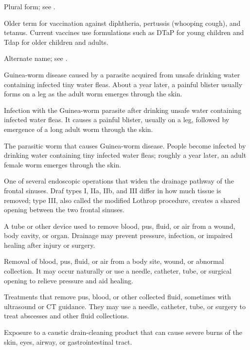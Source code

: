  Plural form; see .

 Older term for vaccination against diphtheria, pertussis (whooping cough), and tetanus. Current vaccines use formulations such as DTaP for young children and Tdap for older children and adults.

 Alternate name; see .

 Guinea-worm disease caused by a parasite acquired from unsafe drinking water containing infected tiny water fleas. About a year later, a painful blister usually forms on a leg as the adult worm emerges through the skin.

 Infection with the Guinea-worm parasite after drinking unsafe water containing infected water fleas. It causes a painful blister, usually on a leg, followed by emergence of a long adult worm through the skin.

 The parasitic worm that causes Guinea-worm disease. People become infected by drinking water containing tiny infected water fleas; roughly a year later, an adult female worm emerges through the skin.

 One of several endoscopic operations that widen the drainage pathway of the frontal sinuses. Draf types I, IIa, IIb, and III differ in how much tissue is removed; type III, also called the modified Lothrop procedure, creates a shared opening between the two frontal sinuses.

 A tube or other device used to remove blood, pus, fluid, or air from a wound, body cavity, or organ. Drainage may prevent pressure, infection, or impaired healing after injury or surgery.

 Removal of blood, pus, fluid, or air from a body site, wound, or abnormal collection. It may occur naturally or use a needle, catheter, tube, or surgical opening to relieve pressure and aid healing.

 Treatments that remove pus, blood, or other collected fluid, sometimes with ultrasound or CT guidance. They may use a needle, catheter, tube, or surgery to treat abscesses and other fluid collections.

 Exposure to a caustic drain-cleaning product that can cause severe burns of the skin, eyes, airway, or gastrointestinal tract.

